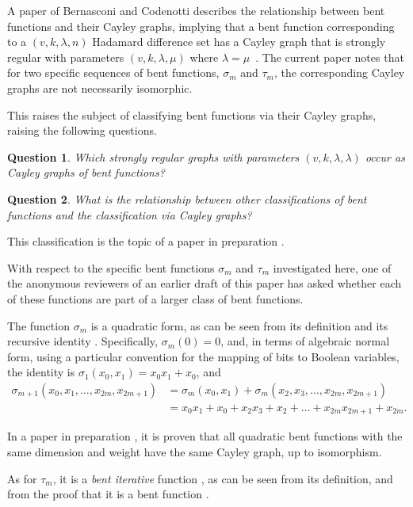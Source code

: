 \documentclass[12pt,a4paper]{article}
\newtheorem{Question}{Question}
\begin{document}
A paper of Bernasconi and Codenotti describes the relationship between bent functions and
their Cayley graphs, implying that a bent function corresponding to a $(v,k,\lambda,n)$ Hada\-mard difference set has a Cayley graph
that is strongly regular with parameters $(v,k,\lambda,\mu)$ where $\lambda=\mu$~\cite[Lemma 12]{BerC99}.
The current paper notes that for two specific sequences of bent functions, $\sigma_m$ and $\tau_m$,
the corresponding Cayley graphs are not necessarily isomorphic.

This raises the subject of classifying bent functions via their Cayley graphs, raising the following questions.
\begin{Question}
Which strongly regular graphs with parameters $(v,k,\lambda,\lambda)$ occur as Cayley graphs of bent functions?
\end{Question}
\begin{Question}
What is the relationship between other classifications of bent functions and the classification via Cayley graphs?
\end{Question}
This classification is the topic of a paper in preparation \cite{Leo16Classifying}.

With respect to the specific bent functions $\sigma_m$ and $\tau_m$ investigated here,
one of the anonymous reviewers of an earlier draft of this paper has asked whether each of these
functions are part of a larger class of bent functions.

The function $\sigma_m$ is a quadratic form, as can be seen from its definition and
its recursive identity \cite[Lemma 7]{Leo14Constructions}.
Specifically, $\sigma_m(0)=0$,
and, in terms of algebraic normal form,
using a particular convention for the mapping of bits to Boolean
variables, the identity is $\sigma_1(x_0,x_1)=x_0 x_1 + x_0$, and
\begin{align*}
\sigma_{m+1}(x_0,x_1,\ldots,x_{2m},x_{2m+1})
&=
\sigma_m(x_0,x_1) +
\sigma_m(x_2,x_3,\ldots,x_{2m},x_{2m+1})
\\
&= x_0 x_1 + x_0 + x_2 x_3 + x_2 + \ldots + x_{2m} x_{2m+1} + x_{2m}.
\end{align*}

In a paper in preparation \cite{Leo16Classifying},
it is proven that all quadratic bent functions with
the same dimension and weight have the same Cayley graph, up to isomorphism.

As for $\tau_m$, it is a \emph{bent iterative} function
\cite[Theorem~V.4]{CanCCP01cryptographic} \cite[Theorem~2]{CanC03decomposing} \cite{Tok11number},
as can be seen from its definition, and from the proof that it is a bent function
\cite[Theorem 3.1]{Leo15Twin}.
\end{document}
